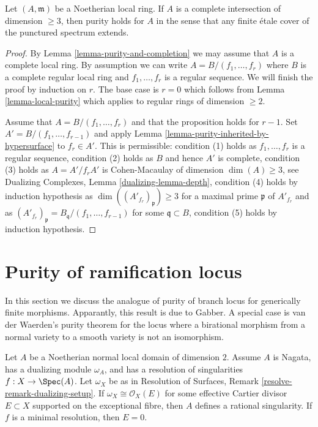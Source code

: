 \begin{proposition}
\label{proposition-purity-complete-intersection}
Let $(A, \mathfrak m)$ be a Noetherian local ring. If $A$ is a
complete intersection of dimension $\geq 3$, then purity
holds for $A$ in the sense that any finite \'etale cover of
the punctured spectrum extends.
\end{proposition}

\begin{proof}
By Lemma \ref{lemma-purity-and-completion} we may assume that $A$ is
a complete local ring. By assumption we can write
$A = B/(f_1, \ldots, f_r)$ where $B$ is a complete regular local
ring and $f_1, \ldots, f_r$ is a regular sequence.
We will finish the proof by induction on $r$.
The base case is $r = 0$ which follows from
Lemma \ref{lemma-local-purity} which applies to
regular rings of dimension $\geq 2$.

\medskip\noindent
Assume that $A = B/(f_1, \ldots, f_r)$ and that the proposition
holds for $r - 1$. Set $A' = B/(f_1, \ldots, f_{r - 1})$ and apply
Lemma \ref{lemma-purity-inherited-by-hypersurface} to $f_r \in A'$.
This is permissible:
condition (1) holds as $f_1, \ldots, f_r$ is a regular sequence,
condition (2) holds as $B$ and hence $A'$ is complete,
condition (3) holds as $A = A'/f_r A'$ is Cohen-Macaulay of dimension
$\dim(A) \geq 3$, see Dualizing Complexes, Lemma \ref{dualizing-lemma-depth},
condition (4) holds by induction hypothesis as
$\dim((A'_{f_r})_\mathfrak p) \geq 3$ for a maximal
prime $\mathfrak p$ of $A'_{f_r}$ and as
$(A'_{f_r})_\mathfrak p = B_\mathfrak q/(f_1, \ldots, f_{r - 1})$
for some $\mathfrak q \subset B$,
condition (5) holds by induction hypothesis.
\end{proof}





\section{Purity of ramification locus}
\label{section-purity-ramification}

\noindent
In this section we discuss the analogue of purity of branch locus for
generically finite morphisms. Apparantly, this result is due to Gabber.
A special case is van der Waerden's purity theorem for the locus where
a birational morphism from a normal variety to a smooth variety is not
an isomorphism.

\begin{lemma}
\label{lemma-characterize-rational-singularity}
Let $A$ be a Noetherian normal local domain of dimension $2$.
Assume $A$ is Nagata, has a dualizing module $\omega_A$, and has a
resolution of singularities $f : X \to \Spec(A)$.
Let $\omega_X$ be as in Resolution of Surfaces,
Remark \ref{resolve-remark-dualizing-setup}.
If $\omega_X \cong \mathcal{O}_X(E)$ for some effective
Cartier divisor $E \subset X$ supported on the exceptional
fibre, then $A$ defines a rational singularity.
If $f$ is a minimal resolution, then $E = 0$.
\end{lemma}

